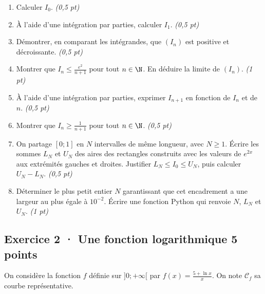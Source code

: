 \begin{enumerate}

\item Calculer $I_0$. \hfill\textit{(0{,}5 pt)}

\item À l'aide d'une intégration par parties, calculer $I_1$. \hfill\textit{(0{,}5 pt)}

\item Démontrer, en comparant les intégrandes, que $(I_n)$ est positive et décroissante. \hfill\textit{(0{,}5 pt)}

\item Montrer que $I_n\le\frac{e^{2}}{n+1}$ pour tout $n\in\N$. En déduire la limite de $(I_n)$. \hfill\textit{(1 pt)}

\item À l'aide d'une intégration par parties, exprimer $I_{n+1}$ en fonction de $I_n$ et de $n$. \hfill\textit{(0{,}5 pt)}

\item Montrer que $I_n\ge\frac1{n+1}$ pour tout $n\in\N$. \hfill\textit{(0{,}5 pt)}

\item On partage $[0;1]$ en $N$ intervalles de même longueur, avec $N\ge1$. Écrire les sommes $L_N$ et $U_N$ des aires des rectangles construits avec les valeurs de $e^{2x}$ aux extrémités gauches et droites. Justifier $L_N\le I_0\le U_N$, puis calculer $U_N-L_N$. \hfill\textit{(0{,}5 pt)}

\item Déterminer le plus petit entier $N$ garantissant que cet encadrement a une largeur au plus égale à $10^{-2}$. Écrire une fonction Python qui renvoie $N$, $L_N$ et $U_N$. \hfill\textit{(1 pt)}

\end{enumerate}

\subsection*{Exercice 2 · Une fonction logarithmique \hfill 5 points}On considère la fonction $f$ définie sur $]0;+\infty[$ par $f(x)=\frac{5+\ln x}x$. On note $\mathcal C_f$ sa courbe représentative.

